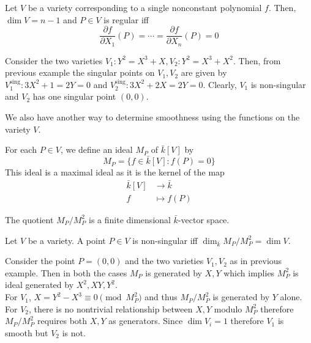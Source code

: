 \documentclass[oneside, 12pt]{scrbook}
\theoremstyle{theorem}
\begin{document}
\begin{example}
Let $V$ be a variety corresponding to a single nonconstant polynomial $f$. Then, $\dim V =n-1$ and $P \in V$ is regular iff 
\begin{equation}
\frac{\partial f}{\partial X_{1}}(P) = \cdots = \frac{\partial f}{\partial X_{n}}(P) = 0
\end{equation}
\end{example}

\begin{example}
Consider the two varieties $V_{1}: Y^2 = X^3 + X , V_{2}: Y^2 = X^3 + X^2$. Then, from previous example the singular points on $V_{1},V_{2}$ are given by $V_{1}^{\text{sing}}: 3X^2 + 1 = 2Y=0$ and $V_{2}^{\text{sing}}: 3X^2 + 2X = 2Y=0$. Clearly, $V_{1}$ is non-singular and $V_{2}$ has one singular point $(0,0)$.
\end{example}

We also have another way to determine smoothness using the functions on the variety $V$. 

\begin{definition}
For each $P \in V$, we define an ideal $M_{P}$ of $\bar{k}[V]$ by $$M_{P} = \{f \in \bar{k}[V]: f(P)=0\}$$ This ideal is a maximal ideal as it is the kernel of the map 
\begin{align*}
\bar{k}[V] &\rightarrow \bar{k} \\
f &\mapsto f(P)
\end{align*}
\end{definition}

The quotient $M_{P}/M_{P}^2$ is a finite dimensional $\bar{k}$-vector space. 
\begin{proposition}
Let $V$ be a variety. A point $P \in V$ is non-singular iff $\dim_{\bar{k}} M_{P}/M_{P}^2 = \dim V$. 
\end{proposition}

\begin{example}
Consider the point $P = (0,0)$ and the two varieties $V_{1},V_{2}$ as in previous example. Then in both the cases $M_{P}$ is generated by $X,Y$ which implies $M_{P}^2$ is ideal generated by $X^2 , XY, Y^2$. \\

For $V_{1}$, $X=Y^2 - X^3 \equiv 0 \pmod{M_{P}^2}$ and thus $M_{P}/M_{P}^2$ is generated by $Y$ alone. \\

For $V_{2}$, there is no nontrivial relationship between $X,Y$ modulo $M_{P}^2$ therefore $M_{P}/M_{P}^2$ requires both $X,Y$ as generators. Since $\dim V_{i} = 1$ therefore $V_{1}$ is smooth but $V_{2}$ is not. 
\end{example}
\end{document}
